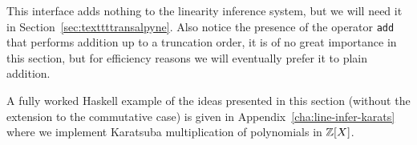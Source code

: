 This interface adds nothing to the linearity inference system, but we
will need it in Section~\ref{sec:texttttransalpyne}.  Also notice the
presence of the operator \lstinline{add} that performs addition up to
a truncation order, it is of no great importance in this section, but
for efficiency reasons we will eventually prefer it to plain addition.

A fully worked Haskell example of the ideas presented in this section
(without the extension to the commutative case) is given in
Appendix~\ref{cha:line-infer-karats} where we implement Karatsuba
multiplication of polynomials in $\mathbb{Z}[X]$.


%
